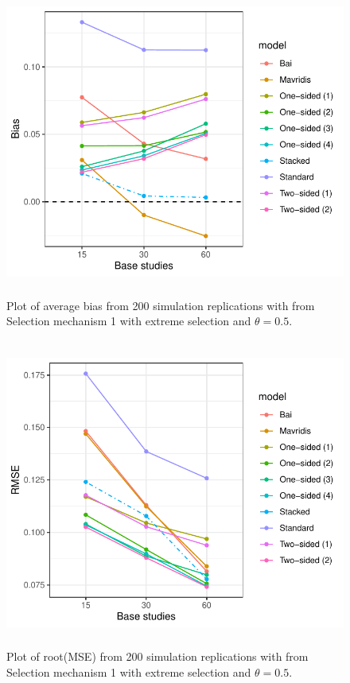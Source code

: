 \documentclass[12pt]{article}   	%
\numberwithin{equation}{section}
\begin{document}
\begin{figure}
\includegraphics[height = 4in, width = 5in]{extreme_big_bias.pdf}
\caption{Plot of average bias from 200 simulation replications with from Selection mechanism 1 with extreme selection and $\theta = 0.5$.}
\label{fig:func1_extreme_big_bias}
\end{figure}

\begin{figure}
\includegraphics[height = 4in, width = 5in]{extreme_big_rmse.pdf}
\caption{Plot of root(MSE) from 200 simulation replications with from Selection mechanism 1 with extreme selection and $\theta = 0.5$.}
\label{fig:func1_extreme_big_rmse}
\end{figure}
\end{document}
